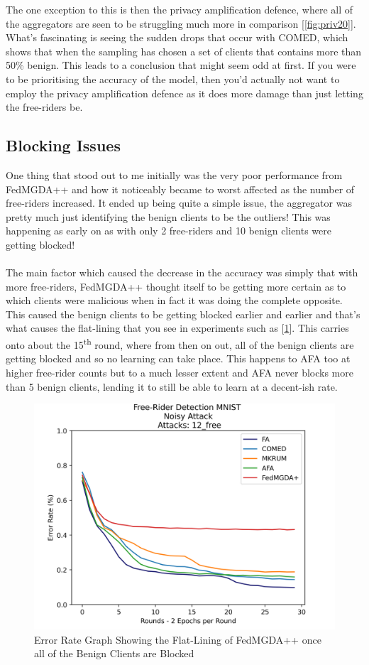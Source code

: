 The one exception to this is then the privacy amplification defence, where all of the aggregators are seen to be struggling much more in comparison [\ref{fig:priv20}].
What's fascinating is seeing the sudden drops that occur with COMED, which shows that when the sampling has chosen a set of clients that contains more than 50\% benign.
This leads to a conclusion that might seem odd at first.
If you were to be prioritising the accuracy of the model, then you'd actually not want to employ the privacy amplification defence as it does more damage than just letting the free-riders be.

\subsection{Blocking Issues}
One thing that stood out to me initially was the very poor performance from FedMGDA++ and how it noticeably became to worst affected as the number of free-riders increased.
It ended up being quite a simple issue, the aggregator was pretty much just identifying the benign clients to be the outliers!
This was happening as early on as with only 2 free-riders and 10 benign clients were getting blocked!
\\ \\
The main factor which caused the decrease in the accuracy was simply that with more free-riders, FedMGDA++ thought itself to be getting more certain as to which clients were malicious when in fact it was doing the complete opposite.
This caused the benign clients to be getting blocked earlier and earlier and that's what causes the flat-lining that you see in experiments such as [\ref{fig:flat_line}].
This carries onto about the 15\textsuperscript{th} round, where from then on out, all of the benign clients are getting blocked and so no learning can take place.
This happens to AFA too at higher free-rider counts but to a much lesser extent and AFA never blocks more than 5 benign clients, lending it to still be able to learn at a decent-ish rate.

\begin{figure}[htbp]
	\centering
    \includegraphics[scale=0.5]{free_riders/graphs/flat_line.png}
	\caption{Error Rate Graph Showing the Flat-Lining of FedMGDA++ once all of the Benign Clients are Blocked}
	\label{fig:flat_line}
\end{figure}


